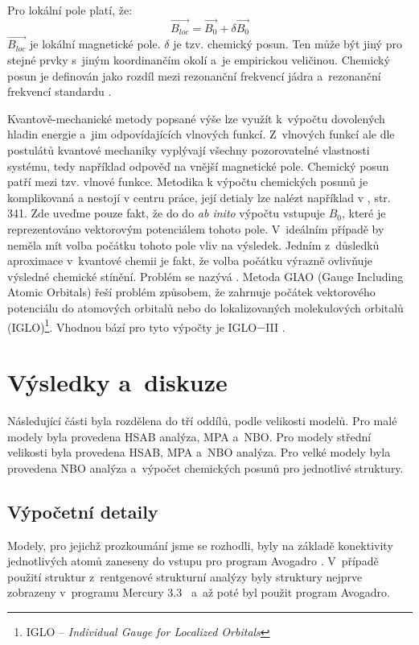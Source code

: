 \documentclass[
digital, %
table,   %
nolof,     %
nolot,     %
oneside,
]{fithesis3}
\begin{document}
Pro lokální pole platí, že:
\begin{equation}
\vec{B_{loc}} = \vec{B_0} + \delta \vec{B_0}
\end{equation}
$\vec{B_{loc}}$ je lokální magnetické pole. $\delta$ je tzv. chemický posun. Ten může být jiný pro stejné prvky s~jiným koordinančím okolí a~je empirickou veličinou. Chemický posun je definován jako rozdíl mezi rezonanční frekvencí jádra a~rezonanční frekvencí standardu \cite{atkins2010atkins}.

Kvantově-mechanické metody popsané výše lze využít k~výpočtu dovolených hladin energie a~jim odpovídajících vlnových funkcí. Z~vlnových funkcí ale dle postulátů kvantové mechaniky vyplývají všechny pozorovatelné vlastnosti systému, tedy například odpověď na vnější magnetické pole. Chemický posun patří mezi tzv.  vlnové funkce. Metodika k výpočtu chemických posunů je komplikovaná a nestojí v centru práce, její detialy lze nalézt například v \cite{jensen2017introduction}, str. 341. Zde uveďme pouze fakt, že do do \textit{ab inito} výpočtu vstupuje $B_0$, které je reprezentováno vektorovým potenciálem tohoto pole. V~ideálním případě by neměla mít volba počátku tohoto pole vliv na výsledek. Jedním z~důsledků aproximace v~kvantové chemii je fakt, že volba počátku výrazně ovlivňuje výsledné chemické stínění. Problém se nazývá . Metoda GIAO \cite{doi:10.1021/jp9529127} (Gauge  Including Atomic Orbitals) řeší problém způsobem, že zahrnuje počátek vektorového potenciálu do atomových orbitalů nebo do lokalizovaných molekulových orbitalů (IGLO)\footnote{IGLO -- \textit{Individual Gauge for Localized Orbitals}}. Vhodnou bází pro tyto výpočty je IGLO$-$III \cite{Standara2006thesis, g09}.
\chapter{Výsledky a~diskuze}
Následující části byla rozdělena do tří oddílů, podle velikosti modelů. Pro malé modely byla provedena HSAB analýza, MPA a~NBO. Pro modely střední velikosti byla provedena HSAB, MPA a~NBO analýza. Pro velké modely byla provedena NBO analýza a~výpočet chemických posunů pro jednotlivé struktury.

\section{Výpočetní detaily}
Modely, pro jejichž prozkoumání jsme se rozhodli, byly na základě konektivity jednotlivých atomů zaneseny do vstupu pro program Avogadro \cite{Avogadro}. V~případě použití struktur z~rentgenové strukturní analýzy byly struktury nejprve zobrazeny v~programu Mercury 3.3~\cite{Mercury} a~až poté byl použit program Avogadro.
\end{document}
